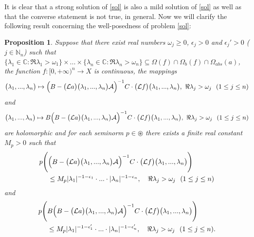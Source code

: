 \documentclass{amsart}
\newtheorem{prop}[thm]{Proposition}
\theoremstyle{definition}
\theoremstyle{remark}
\numberwithin{equation}{section}
\begin{document}
It is clear that a strong solution of \eqref{sol} is also a mild solution of \eqref{sol} as well as that the converse statement is not true, in general. Now we will clarify the following result concerning the well-posedness of problem \eqref{sol}:

\begin{prop}\label{proja}
Suppose that there exist real numbers $\omega_{j}\geq 0$, $\epsilon_{j}>0$ and $\epsilon_{j}'>0$ ($j\in {\mathbb N}_{n}$) such that $\{\lambda_{1} \in {\mathbb C} : \Re \lambda_{1}>\omega_{1}\} \times ... \times \{\lambda_{n} \in {\mathbb C} : \Re \lambda_{n}>\omega_{n}\}\subseteq \Omega (f) \cap \Omega_{b}(f) \cap \Omega_{abs}(a)$, the function $f : [0,+\infty)^{n} \rightarrow X$ is continuous, the mappings{\small
\begin{align}\label{res12}\bigl( \lambda_{1},...,\lambda_{n}\bigr) \mapsto \Bigl( B-\bigl({\mathcal L}a\bigr)\bigl( \lambda_{1},...,\lambda_{n}\bigr){\mathcal A} \Bigr)^{-1}C\cdot \bigl({\mathcal L}f\bigr)\bigl( \lambda_{1},...,\lambda_{n}\bigr),\ \Re \lambda_{j}>\omega_{j}\ \ (1\leq j\leq n) \end{align}}
and{\small 
\begin{align}\label{res123}\bigl( \lambda_{1},...,\lambda_{n}\bigr) \mapsto B\Bigl( B-\bigl({\mathcal L}a\bigr)\bigl( \lambda_{1},...,\lambda_{n}\bigr){\mathcal A} \Bigr)^{-1}C\cdot \bigl({\mathcal L}f\bigr)\bigl( \lambda_{1},...,\lambda_{n}\bigr),\ \Re \lambda_{j}>\omega_{j}\ \ (1\leq j\leq n) \end{align}}
are holomorphic and for each seminorm $p\in \circledast$ there exists a finite real constant $M_{p}>0$ such that
\begin{align} \notag
p\Biggl( & \Bigl( B-\bigl({\mathcal L}a\bigr)\bigl( \lambda_{1},...,\lambda_{n}\bigr){\mathcal A} \Bigr)^{-1}C\cdot \bigl({\mathcal L}f\bigr)\bigl( \lambda_{1},...,\lambda_{n}\bigr)\Biggr) 
\\\label{p1}& \leq M_{p}|\lambda_{1}|^{-1-\epsilon_{1}}\cdot ...\cdot |\lambda_{n}|^{-1-\epsilon_{n}},\quad \Re \lambda_{j}>\omega_{j}\ \ (1\leq j\leq n) 
\end{align}
and
\begin{align} \notag
p\Biggl( & B\Bigl( B-\bigl({\mathcal L}a\bigr)\bigl( \lambda_{1},...,\lambda_{n}\bigr){\mathcal A} \Bigr)^{-1}C\cdot \bigl({\mathcal L}f\bigr)\bigl( \lambda_{1},...,\lambda_{n}\bigr)\Biggr) 
\\\label{p2}& \leq M_{p}|\lambda_{1}|^{-1-\epsilon_{1}'}\cdot ...\cdot |\lambda_{n}|^{-1-\epsilon_{n}'},\quad \Re \lambda_{j}>\omega_{j}\ \ (1\leq j\leq n) .

\end{align}
\end{prop}
\end{document}
